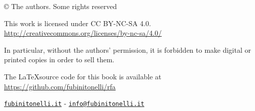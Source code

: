 
© The authors. Some rights reserved

This work is licensed under CC BY-NC-SA 4.0.\\
\url{http://creativecommons.org/licenses/by-nc-sa/4.0/}

In particular, without the authors' permission, it is forbidden to make digital or printed copies in order to sell them.

The \LaTeX source code for this book is available at \\
\url{https://github.com/fubinitonelli/rfa}

\href{https://fubinitonelli.it}{\texttt{fubinitonelli.it}} - \href{mailto:info@fubinitonelli.it}{\texttt{info@fubinitonelli.it}}